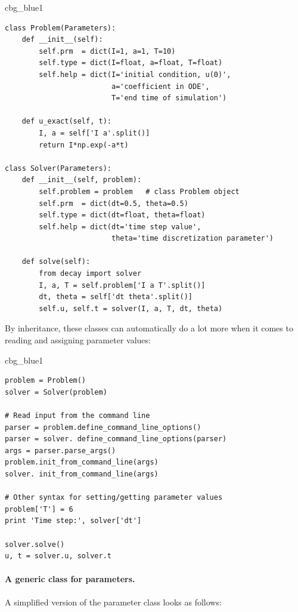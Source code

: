\documentclass[%
oneside,                 %
final,                   %
10pt]{article}
\newenvironment{_cod_tight}[1]{
   \def\FrameCommand{\colorbox{#1}}
   \FrameRule0.6pt\MakeFramed {\FrameRestore}\vskip3mm}
   {\vskip0mm\endMakeFramed}
\newenvironment{cod}[1]{
\bgroup\rmfamily
\fboxsep=0mm\relax
\begin{_cod_tight}{#1}
\list{}{\parsep=-2mm\parskip=0mm\topsep=0pt\leftmargin=2mm
\rightmargin=2\leftmargin\leftmargin=4pt\relax}
\item\relax}
{\endlist\end{_cod_tight}\egroup}
\begin{document}
\begin{cod}{cbg_blue1}\begin{Verbatim}[numbers=none,fontsize=\fontsize{9pt}{9pt},baselinestretch=0.95,xleftmargin=2mm]
class Problem(Parameters):
    def __init__(self):
        self.prm  = dict(I=1, a=1, T=10)
        self.type = dict(I=float, a=float, T=float)
        self.help = dict(I='initial condition, u(0)',
                         a='coefficient in ODE',
                         T='end time of simulation')

    def u_exact(self, t):
        I, a = self['I a'.split()]
        return I*np.exp(-a*t)

class Solver(Parameters):
    def __init__(self, problem):
        self.problem = problem   # class Problem object
        self.prm  = dict(dt=0.5, theta=0.5)
        self.type = dict(dt=float, theta=float)
        self.help = dict(dt='time step value',
                         theta='time discretization parameter')

    def solve(self):
        from decay import solver
        I, a, T = self.problem['I a T'.split()]
        dt, theta = self['dt theta'.split()]
        self.u, self.t = solver(I, a, T, dt, theta)
\end{Verbatim}
\end{cod}
\noindent
By inheritance, these classes can automatically do a lot more when it comes to
reading and assigning parameter values:

\begin{cod}{cbg_blue1}\begin{Verbatim}[numbers=none,fontsize=\fontsize{9pt}{9pt},baselinestretch=0.95,xleftmargin=2mm]
problem = Problem()
solver = Solver(problem)

# Read input from the command line
parser = problem.define_command_line_options()
parser = solver. define_command_line_options(parser)
args = parser.parse_args()
problem.init_from_command_line(args)
solver. init_from_command_line(args)

# Other syntax for setting/getting parameter values
problem['T'] = 6
print 'Time step:', solver['dt']

solver.solve()
u, t = solver.u, solver.t
\end{Verbatim}
\end{cod}
\noindent

\paragraph{A generic class for parameters.}
A simplified version of the parameter class looks as follows:
\end{document}
